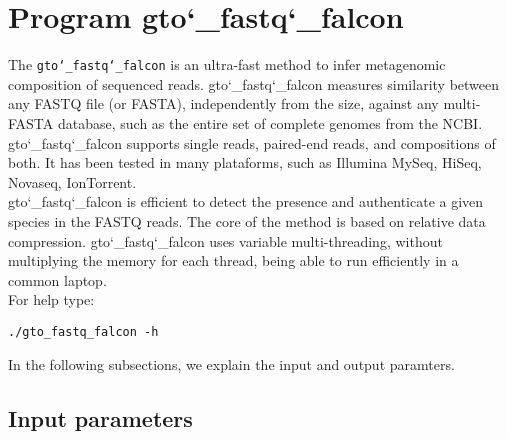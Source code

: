 \section{Program gto\char`_fastq\char`_falcon}
The \texttt{gto\char`_fastq\char`_falcon} is an ultra-fast method to infer metagenomic composition of sequenced reads. gto\char`_fastq\char`_falcon measures similarity between any FASTQ file (or FASTA), independently from the size, against any multi-FASTA database, such as the entire set of complete genomes from the NCBI. gto\char`_fastq\char`_falcon supports single reads, paired-end reads, and compositions of both. It has been tested in many plataforms, such as Illumina MySeq, HiSeq, Novaseq, IonTorrent.\\
gto\char`_fastq\char`_falcon is efficient to detect the presence and authenticate a given species in the FASTQ reads. The core of the method is based on relative data compression. gto\char`_fastq\char`_falcon uses variable multi-threading, without multiplying the memory for each thread, being able to run efficiently in a common laptop.\\
For help type:
\begin{lstlisting}
./gto_fastq_falcon -h
\end{lstlisting}
In the following subsections, we explain the input and output paramters.

\subsection*{Input parameters}

